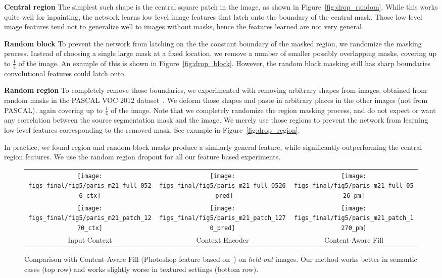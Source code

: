 \documentclass[10pt,twocolumn,letterpaper]{article}
\newcommand{\reffig}[1]{Figure~\ref{fig:#1}}
\newcommand{\lblfig}[1]{\label{fig:#1}}
\begin{document}
{\bf Central region} The simplest such shape is the central square patch in the image, as shown in \reffig{drop_random}.
While this works quite well for inpainting, the network learns low level image features that latch onto the boundary of the central mask.
Those low level image features tend not to generalize well to images without masks, hence the features learned are not very general.

{\bf Random block} To prevent the network from latching on the the constant boundary of the masked region, we randomize the masking process.
Instead of choosing a single large mask at a fixed location, we remove a number of smaller possibly overlapping masks, covering up to $\frac{1}{4}$ of the image.
An example of this is shown in \reffig{drop_block}.
However, the random block masking still has sharp boundaries convolutional features could latch onto.

{\bf Random region} To completely remove those boundaries, we experimented with removing arbitrary shapes from images, obtained from random masks in the PASCAL VOC 2012 dataset~\cite{everingham2014pascal}.
We deform those shapes and paste in arbitrary places in the other images (not from PASCAL), again covering up to $\frac{1}{4}$ of the image.
Note that we completely randomize the region masking process, and do not expect or want any correlation between the source segmentation mask and the image.
We merely use those regions to prevent the network from learning low-level features corresponding to the removed mask.
See example in \reffig{drop_region}.

In practice, we found region and random block masks produce a similarly general feature, while significantly outperforming the central region features.
We use the random region dropout for all our feature based experiments.

\begin{figure}[t]
\vspace{-0.5em}
\centering
\begin{tabular}{c@{\hskip 4pt}c@{\hskip 4pt}c}
\texttt{[image: figs\_final/fig5/paris\_m21\_full\_0526\_ctx]} &
\texttt{[image: figs\_final/fig5/paris\_m21\_full\_0526\_pred]} &
\texttt{[image: figs\_final/fig5/paris\_m21\_full\_0526\_pm]} \\
\texttt{[image: figs\_final/fig5/paris\_m21\_patch\_1270\_ctx]} &
\texttt{[image: figs\_final/fig5/paris\_m21\_patch\_1270\_pred]} &
\texttt{[image: figs\_final/fig5/paris\_m21\_patch\_1270\_pm]} \\
\small Input Context & \small  Context Encoder & \small  Content-Aware Fill
\end{tabular}
\vspace{-0.5em}
\caption{Comparison with Content-Aware Fill (Photoshop feature based on~\cite{barnes2009patchmatch}) on \textit{held-out} images. Our method works better in semantic cases (top row) and works slightly worse in textured settings (bottom row).}
\lblfig{bad_results}
\vspace{-0.5em}
\end{figure}
\end{document}
